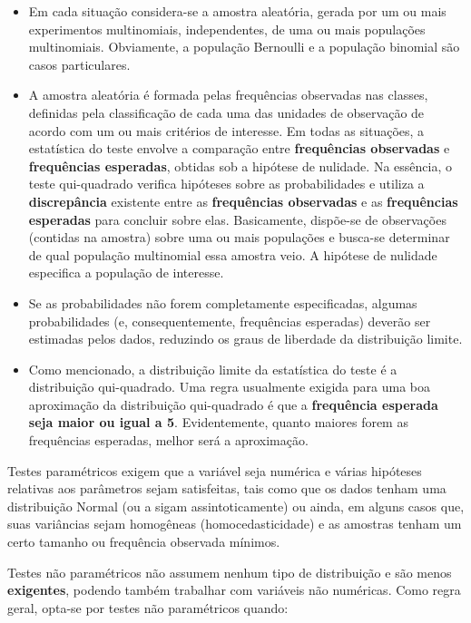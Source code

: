 \documentclass[
]{book}
\providecommand{\tightlist}{%
  \setlength{\itemsep}{0pt}\setlength{\parskip}{0pt}}
\begin{document}
\begin{itemize}
\tightlist
\item
  Em cada situação considera-se a amostra aleatória, gerada por um ou mais experimentos multinomiais, independentes, de uma ou mais populações multinomiais. Obviamente, a população Bernoulli e a população binomial são casos particulares.\\
\item
  A amostra aleatória é formada pelas frequências observadas nas classes, definidas pela classificação de cada uma das unidades de observação de acordo com um ou mais critérios de interesse. Em todas as situações, a estatística do teste envolve a comparação entre \textbf{frequências observadas} e \textbf{frequências esperadas}, obtidas sob a hipótese de nulidade. Na essência, o teste qui-quadrado verifica hipóteses sobre as probabilidades e utiliza a \textbf{discrepância} existente entre as \textbf{frequências observadas} e as \textbf{frequências esperadas} para concluir sobre elas. Basicamente, dispõe-se de observações (contidas na amostra) sobre uma ou mais populações e busca-se determinar de qual população multinomial essa amostra veio. A hipótese de nulidade especifica a população de interesse.
\item
  Se as probabilidades não forem completamente especificadas, algumas probabilidades (e, consequentemente, frequências esperadas) deverão ser estimadas pelos dados, reduzindo os graus de liberdade da distribuição limite.\\
\item
  Como mencionado, a distribuição limite da estatística do teste é a distribuição qui-quadrado. Uma regra usualmente exigida para uma boa aproximação da distribuição qui-quadrado é que a \textbf{frequência esperada seja maior ou igual a 5}. Evidentemente, quanto maiores forem as frequências esperadas, melhor será a aproximação.
\end{itemize}

\hfill\break

Testes paramétricos exigem que a variável seja numérica e várias hipóteses relativas aos parâmetros sejam satisfeitas, tais como que os dados tenham uma distribuição Normal (ou a sigam assintoticamente) ou ainda, em alguns casos que, suas variâncias sejam homogêneas (homocedasticidade) e as amostras tenham um certo tamanho ou frequência observada mínimos.

\hfill\break

Testes não paramétricos não assumem nenhum tipo de distribuição e são menos \textbf{exigentes}, podendo também trabalhar com variáveis não numéricas. Como regra geral, opta-se por testes não paramétricos quando:
\end{document}
